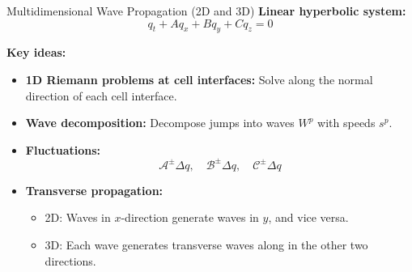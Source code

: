 \begin{frame}{Multidimensional Wave Propagation (2D and 3D)}
	\scriptsize
	\textbf{Linear hyperbolic system:}
			\[
			q_t + Aq_x + Bq_y + Cq_z = 0
			\]
			
			\textbf{Key ideas:}
			\begin{itemize}
				\item \textbf{1D Riemann problems at cell interfaces:}  
				Solve along the normal direction of each cell interface.
				\item \textbf{Wave decomposition:}  
				Decompose jumps into waves \(W^p\) with speeds \(s^p\).
				\item \textbf{Fluctuations:}  
				\[
				\mathcal{A}^\pm \Delta q, \quad 
				\mathcal{B}^\pm \Delta q, \quad 
				\mathcal{C}^\pm \Delta q
				\]
				\pause
				\item \textbf{Transverse propagation:}  
				\begin{itemize}
					\item 2D: Waves in \(x\)-direction generate waves in \(y\), and vice versa.
					\item 3D: Each wave generates transverse waves along in the other two directions.
				\end{itemize}
			\end{itemize}
\end{frame}


 \begin{comment}
       \begin{tikzpicture}[scale=0.8]
       	\node at (2,4.5) {2D grid};
        \draw (0,0) rectangle (4,4);
      
        \node at (1,1) {$(i,j)$};
        \node at (3,1) {$(i+1,j)$};
        \node at (1,3) {$(i,j+1)$};
        \node at (3,3) {$(i+1,j+1)$};
      
        \draw[dashed] (2,0) -- (2,4);
        \draw[dashed] (0,2) -- (4,2);
       
       \node[below] at (0.5,0) {$x_{i-1/2}$};
       \node[below] at (2,0) {$x_{i+1/2}$};
       \node[below] at (4,0) {$x_{i+3/2}$};
       \node[left]  at (0,0.0) {$y_{j-1/2}$};
       \node[left]  at (0,2.1) {$y_{j+1/2}$};
       \node[left] at (0,1.8) {$x_{i-1/2}$};
       \node[left]  at (0,4) {$y_{j+3/2}$};
       \node[right]  at (4,0) {$y_{j-1/2}$};
       \node[right]  at (4,4) {$y_{j+3/2}$};
       \node[right] at (4,1.8) {$x_{i+3/2}$};
       \node[right]  at (4,2.1) {$y_{j+1/2}$};
 	   \node[above] at (0,4) {$x_{i-1/2}$};
 	   \node[above] at (4,4) {$x_{i+3/2}$};
      \end{tikzpicture}
\end{comment}


